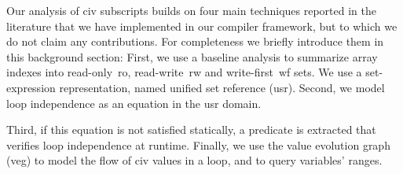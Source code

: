 \documentclass{sig-alternate}
\begin{document}
Our analysis of {\sc civ} subscripts builds on four main techniques reported 
in the literature that we have implemented in our compiler framework,
but to which we do not claim any contributions.
For completeness we briefly introduce them in this background section:
%
First, we use a baseline analysis to summarize
array indexes into read-only~{\sc ro}, read-write~{\sc rw} and 
write-first~{\sc wf} sets. We use a set-expression
representation, named unified set reference ({\sc usr}).
%
Second, we model loop independence as an equation in the {\sc usr} domain. 

Third, if this equation is not satisfied statically, a predicate is
extracted that verifies loop independence at runtime. 
%
Finally, we use the value evolution graph ({\sc veg}) to model the flow of 
{\sc civ} values in a loop,
and to query variables'  ranges. %
\end{document}
